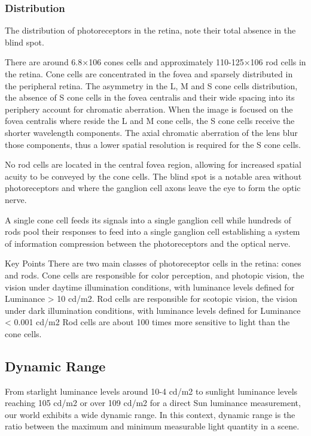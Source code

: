 \subsubsection{Distribution}%
\label{subsubsec:distribution}

The distribution of photoreceptors in the retina, note their total absence in the blind spot.

There are around 6.8×106 cones cells and approximately 110-125×106 rod cells in the retina. Cone cells are concentrated in the fovea and sparsely distributed in the peripheral retina. The asymmetry in the L, M and S cone cells distribution, the absence of S cone cells in the fovea centralis and their wide spacing into its periphery account for chromatic aberration. When the image is focused on the fovea centralis where reside the L and M cone cells, the S cone cells receive the shorter wavelength components. The axial chromatic aberration of the lens blur those components, thus a lower spatial resolution is required for the S cone cells.

No rod cells are located in the central fovea region, allowing for increased spatial acuity to be conveyed by the cone cells. The blind spot is a notable area without photoreceptors and where the ganglion cell axons leave the eye to form the optic nerve.

A single cone cell feeds its signals into a single ganglion cell while hundreds of rods pool their responses to feed into a single ganglion cell establishing a system of information compression between the photoreceptors and the optical nerve.

Key Points
There are two main classes of photoreceptor cells in the retina: cones and rods.
Cone cells are responsible for color perception, and photopic vision, the vision under daytime illumination conditions, with luminance levels defined for Luminance > 10 cd/m2.
Rod cells are responsible for scotopic vision, the vision under dark illumination conditions, with  luminance levels defined for Luminance < 0.001 cd/m2
Rod cells are about 100 times more sensitive to light than the cone cells.

\subsection{Dynamic Range}%
\label{subsec:dynamic-range}

From starlight luminance levels around 10-4 cd/m2 to sunlight luminance levels reaching 105 cd/m2 or over 109 cd/m2 for a direct Sun luminance measurement, our world exhibits a wide dynamic range. In this context, dynamic range is the ratio between the maximum and minimum measurable light quantity in a scene.

